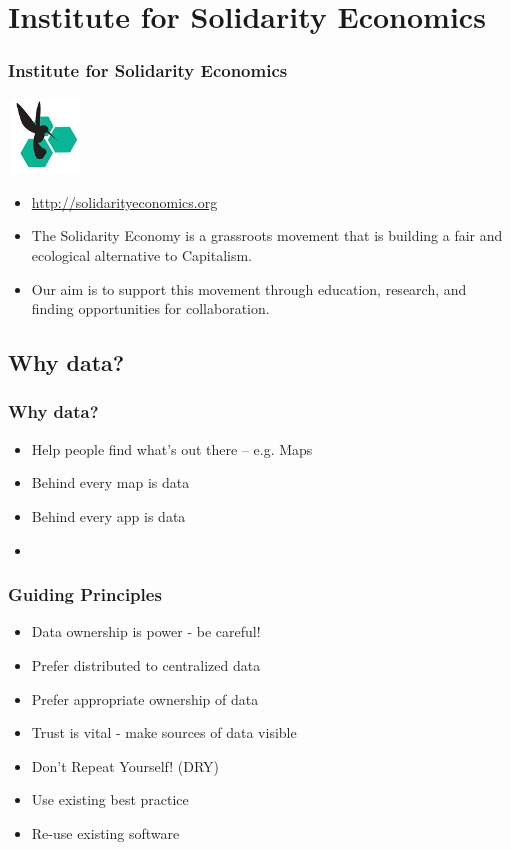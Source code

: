 \frame{\tableofcontents}

\section{Institute for Solidarity Economics}
\frame
{
  \frametitle{Institute for Solidarity Economics}
  \begin{center}
    \includegraphics[height=2cm,width=2cm]{ise-logo.jpg}
  \end{center}
  \begin{itemize}
    \item<1-> \url{http://solidarityeconomics.org}
    \item<1-> The Solidarity Economy is a grassroots movement that is building a fair and ecological alternative to Capitalism.
    \item<1-> Our aim is to support this movement through education, research, and finding opportunities for collaboration.
  \end{itemize}
}
\subsection{Why data?}
\frame
{
  \frametitle{Why data?}
  \begin{itemize}
    \item Help people find what's out there -- e.g. Maps
    \item Behind every map is data
    \item Behind every app is data
    \item 
  \end{itemize}
}
\frame
{
  \frametitle{Guiding Principles}
  \begin{itemize}
    \item Data ownership is power - be careful!
    \item Prefer distributed to centralized data
    \item Prefer appropriate ownership of data
    \item Trust is vital - make sources of data visible
    \item Don't Repeat Yourself! (DRY)
    \item Use existing best practice
    \item Re-use existing software
  \end{itemize}
}
